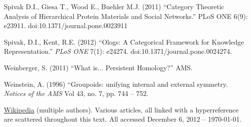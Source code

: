 \documentclass[a4paper]{book}
\theoremstyle{myth}
\begin{document}
\begin{english}
\begin{thebibliography}{SGWB}
 Spivak D.I., Giesa T., Wood E., Buehler M.J. (2011) “Category Theoretic Analysis of Hierarchical Protein Materials and Social Networks.” PLoS ONE 6(9): e23911. doi:10.1371/journal.pone.0023911

 Spivak, D.I., Kent, R.E. (2012) “Ologs: A Categorical Framework for Knowledge Representation.” {\em PLoS ONE} 7(1): e24274. doi:10.1371/journal.pone.0024274.

 Weinberger, S. (2011) “What is... Persistent Homology?” AMS.

 Weinstein, A. (1996) “Groupoids: unifying internal and external symmetry. {\em Notices of the AMS} Vol 43, no. 7, pp. 744 -- 752.

 \href{http://www.wikipedia.org}{\text Wikipedia} (multiple authors). Various articles, all linked with a hyperreference are scattered throughout this text. All accessed December 6, 2012 -- \today.

\end{thebibliography}

\end{english}
\end{document}
